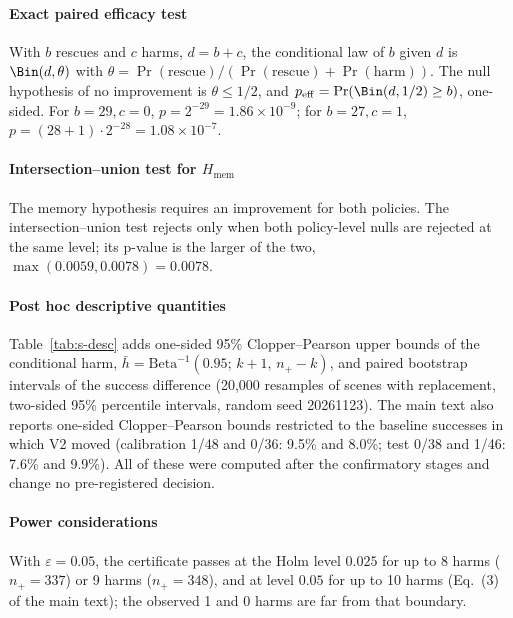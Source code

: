 \paragraph{Exact paired efficacy test} With $b$ rescues and $c$ harms, $d=b+c$, the conditional law of $b$ given $d$ is $\Bin(d,\theta)$ with $\theta=\Pr(\text{rescue})/(\Pr(\text{rescue})+\Pr(\text{harm}))$. The null hypothesis of no improvement is $\theta\le1/2$, and $p_{\mathrm{eff}}=\Pr(\Bin(d,1/2)\ge b)$, one-sided. For $b=29,c=0$, $p=2^{-29}=1.86\times10^{-9}$; for $b=27,c=1$, $p=(28+1)\cdot2^{-28}=1.08\times10^{-7}$.

\paragraph{Intersection--union test for $H_{\mathrm{mem}}$} The memory hypothesis requires an improvement for both policies. The intersection--union test rejects only when both policy-level nulls are rejected at the same level; its p-value is the larger of the two, $\max(0.0059,0.0078)=0.0078$.

\paragraph{Post hoc descriptive quantities} Table~\ref{tab:s-desc} adds one-sided 95\% Clopper--Pearson upper bounds of the conditional harm, $\bar h=\mathrm{Beta}^{-1}(0.95;\,k+1,\,n_+-k)$, and paired bootstrap intervals of the success difference (20,000 resamples of scenes with replacement, two-sided 95\% percentile intervals, random seed 20261123). The main text also reports one-sided Clopper--Pearson bounds restricted to the baseline successes in which V2 moved (calibration 1/48 and 0/36: 9.5\% and 8.0\%; test 0/38 and 1/46: 7.6\% and 9.9\%). All of these were computed after the confirmatory stages and change no pre-registered decision.

\begin{table}[!htbp]
\centering\footnotesize
\caption{Post hoc descriptive quantities for calibration and Final Test. ``Moved among $Y_0{=}1$'': baseline successes in which V2 made a move.}\label{tab:s-desc}
\resizebox{\linewidth}{!}{}
\end{table}

\paragraph{Power considerations} With $\varepsilon=0.05$, the certificate passes at the Holm level $0.025$ for up to 8 harms ($n_+=337$) or 9 harms ($n_+=348$), and at level $0.05$ for up to 10 harms (Eq.~(3) of the main text); the observed 1 and 0 harms are far from that boundary.
